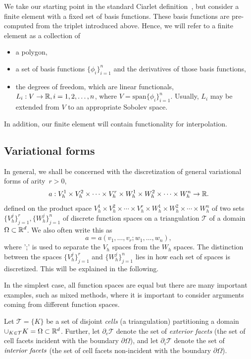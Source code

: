 We take our starting point in the standard Ciarlet
definition~\cite{Cia78}, but consider a finite element with a fixed
set of basis functions.  These basis functions are pre-computed from
the triplet introduced above. Hence, we will refer to a finite
element as a collection of
\begin{itemize}
\item a polygon,  
\item a set of basis functions $\{\phi_i\}_{i=1}^n$ and
the derivatives of those basis functions,
\item the degrees of freedom, which are linear functionals, $L_i : V
\rightarrow \mathbb{R}, i = 1, 2, \ldots, n$, where $V = \mathrm{span}\{\phi_i\}_{i=1}^n$.  Usually,
$L_i$ may be extended from $V$ to an appropriate Sobolev space.
\end{itemize}
In addition, our finite element will contain functionality
for interpolation. 

\subsection{Variational forms}

In general, we shall be concerned with the discretization of general
variational forms of arity~$r > 0$,
\begin{equation} \label{eq:variationalform}
  a : V_h^1 \times V_h^2 \times \cdots \times V_h^r \times
  W_h^1 \times W_h^2 \times \cdots \times W_h^n \rightarrow \mathbb{R}.
\end{equation}
defined on the product space $V_h^1 \times V_h^2 \times \cdots \times
V_h^r \times W_h^1 \times W_h^2 \times \cdots \times W_h^n$ of two sets
$\{V_h^j\}_{j=1}^r, \{W_h^j\}_{j=1}^n$ of discrete function spaces on
a triangulation $\mathcal{T}$ of a domain $\Omega \subset \mathbb{R}^d$. 
We also often write this as 
\begin{equation}
a = a(v_1, \ldots, v_r; w_1, \ldots, w_n), 
\end{equation}
where ';' is used to separate the $V_h$ spaces from the $W_h$ spaces.
The distinction between the spaces $\{V_h^j\}_{j=1}^r$ and
$\{W_h^j\}_{j=1}^n$ lies in how each set of spaces is
discretized. This will be explained in the following.

In the simplest case, all function spaces are equal but there are many
important examples, such as mixed methods, where it is important to
consider arguments coming from different function spaces.

Let $\mathcal{T} = \{K\}$ be a set of disjoint \emph{cells} (a
triangulation) partitioning a domain $\cup_{K\in\mathcal{T}} K =
\Omega \subset \mathbb{R}^d$. Further, let $\partial_e \mathcal{T}$ denote the
set of \emph{exterior facets} (the set of cell facets incident with
the boundary $\partial \Omega$), and let $\partial_i \mathcal{T}$
denote the set of $\emph{interior facets}$ (the set of cell facets
non-incident with the boundary $\partial \Omega$).

